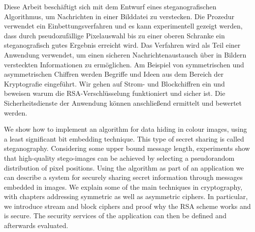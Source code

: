 \newenvironment{abstractpage}
{\cleardoublepage\vspace*{\fill}\thispagestyle{empty}}
{\vfill\cleardoublepage}
\newenvironment{myabstract}[1]
{\bigskip\selectlanguage{#1}
  \begin{center}
    \bfseries\abstractname
  \end{center}}
{\par\bigskip}

\begin{abstractpage}
  \begin{myabstract}{german}
    Diese Arbeit beschäftigt sich mit dem Entwurf eines steganografischen Algorithmus, um
    Nachrichten in einer Bilddatei zu verstecken.
    Die Prozedur verwendet ein  Einbettungsverfahren und es
    kann experimentell gezeigt werden, dass durch pseudozufällige
    Pixelauswahl bis zu einer oberen Schranke ein
    steganografisch gutes Ergebnis erreicht wird.
    Das Verfahren wird als Teil einer Anwendung verwendet,
    um einen sicheren Nachrichtenaustausch über in Bildern versteckten
    Informationen zu ermöglichen. Am Beispiel von
    symmetrischen und asymmetrischen Chiffren werden Begriffe und Ideen
    aus dem Bereich der Kryptografie eingeführt. Wir gehen auf
    Strom- und Blockchiffren ein und beweisen warum die
    RSA-Verschlüsselung funktioniert und sicher ist.
    Die Sicherheitsdienste der Anwendung können anschließend ermittelt
    und bewertet werden.
  \end{myabstract}
  \begin{myabstract}{english}
    We show how to implement an algorithm for data hiding in colour images,
    using a least significant bit embedding technique.
    This type of secret sharing is called steganography.
    Considering some upper bound message length,
    experiments show that high-quality stego-images can be achieved
    by selecting a pseudorandom distribution of pixel positions.
    Using the algorithm as part of an application we can describe a system
    for securely sharing secret information through messages embedded in images.
    We explain some of the main techniques in cryptography, with chapters
    addressing symmetric as well as asymmetric ciphers.
    In particular, we introduce stream and block ciphers and proof why the
    RSA scheme works and is secure. The security services of the
    application can then be defined and afterwards evaluated.
  \end{myabstract}
\end{abstractpage}